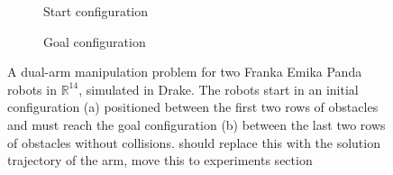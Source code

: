 \begin{figure}[!t]
    \centering
    \begin{subfigure}[b]{0.19\textwidth}
        \centering
        \captionsetup{justification=centering}
        \caption{Start configuration}
        \label{subfig:cage_start_orbit}
    \end{subfigure}\hspace{0.01\textwidth}
    \begin{subfigure}[b]{0.19\textwidth}
        \centering
        \captionsetup{justification=centering}
        \caption{Goal configuration}
        \label{subfig:cage_goal_orbit}
    \end{subfigure}
    \caption{A dual-arm manipulation problem for two Franka Emika Panda robots in $\mathbb{R}^{14}$, simulated in Drake. The robots start in an initial configuration (a) positioned between the first two rows of obstacles and must reach the goal configuration (b) between the last two rows of obstacles without collisions. {\color{red}should replace this with the solution trajectory of the arm, move this to experiments section}}
    \label{fig:simulation}
\end{figure}

